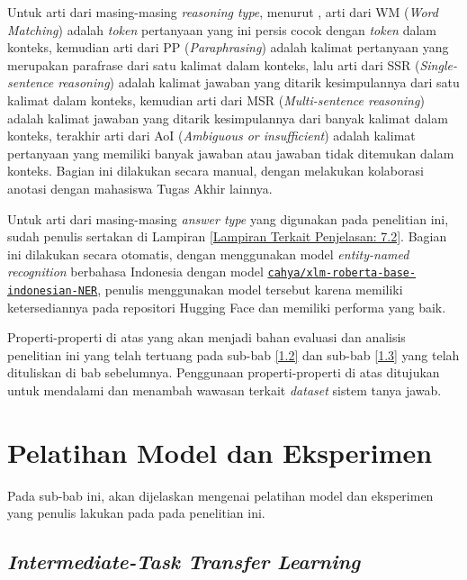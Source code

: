 Untuk arti dari masing-masing \emph{reasoning type}, menurut \citeauthor{9247161}, arti dari WM (\emph{Word Matching}) adalah \emph{token} pertanyaan yang ini persis cocok dengan \emph{token} dalam konteks, kemudian arti dari PP (\emph{Paraphrasing}) adalah kalimat pertanyaan yang merupakan parafrase dari satu kalimat dalam konteks, lalu arti dari SSR (\emph{Single-sentence reasoning}) adalah kalimat jawaban yang ditarik kesimpulannya dari satu kalimat dalam konteks, kemudian arti dari MSR (\emph{Multi-sentence reasoning}) adalah kalimat jawaban yang ditarik kesimpulannya dari banyak kalimat dalam konteks, terakhir arti dari AoI (\emph{Ambiguous or insufficient}) adalah kalimat pertanyaan yang memiliki banyak jawaban atau jawaban tidak ditemukan dalam konteks. Bagian ini dilakukan secara manual, dengan melakukan kolaborasi anotasi dengan mahasiswa Tugas Akhir lainnya.

Untuk arti dari masing-masing \emph{answer type} yang digunakan pada penelitian ini, sudah penulis sertakan di Lampiran \ref{Lampiran Terkait Penjelasan: 7.2}. Bagian ini dilakukan secara otomatis, dengan menggunakan model \emph{entity-named recognition} berbahasa Indonesia dengan model \href{https://huggingface.co/cahya/xlm-roberta-base-indonesian-NER}{\texttt{cahya/xlm-roberta-base-indonesian-NER}}, penulis menggunakan model tersebut karena memiliki ketersediannya pada repositori Hugging Face dan memiliki performa yang baik.

Properti-properti di atas yang akan menjadi bahan evaluasi dan analisis penelitian ini yang telah tertuang pada sub-bab \ref{1.2} dan sub-bab \ref{1.3} yang telah dituliskan di bab sebelumnya. Penggunaan properti-properti di atas ditujukan untuk mendalami dan menambah wawasan terkait \emph{dataset} sistem tanya jawab.

\section{Pelatihan Model dan Eksperimen}
\label{3.4}
Pada sub-bab ini, akan dijelaskan mengenai pelatihan model dan eksperimen yang penulis lakukan pada pada penelitian ini. 

\subsection{\emph{Intermediate-Task Transfer Learning}}
\label{3.4.1}

